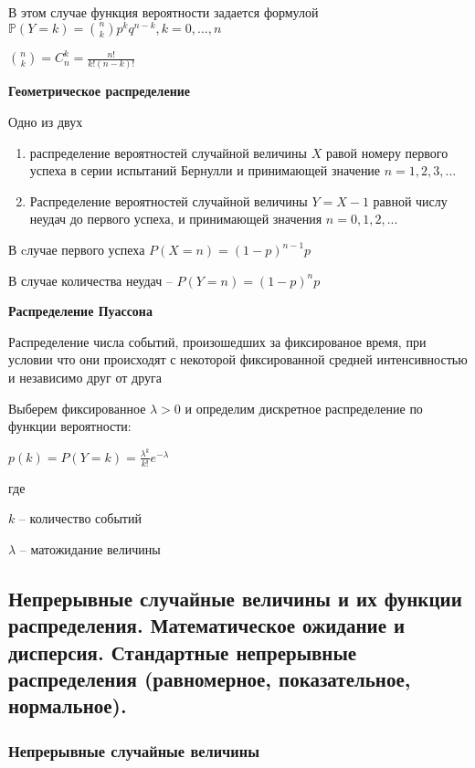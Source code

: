 \documentclass{article}
\begin{document}
В этом случае функция вероятности задается формулой $\mathbb{P}(Y = k) = {n \choose k} p^k q^{n - k}, k = 0, ..., n$

${n \choose k} = C_n^k = \frac{n!}{k!(n-k)!}$

{\bf Геометрическое распределение}

Одно из двух

\begin{enumerate}
	\item распределение вероятностей случайной величины $X$ равой номеру первого успеха в серии испытаний Бернулли и принимающей значение $n = 1, 2, 3,...$
	\item Распределение вероятностей случайной величины $Y = X - 1$ равной числу неудач до первого успеха, и принимающей значения $n = 0, 1, 2,...$
\end{enumerate}

В cлучае первого успеха $P(X = n) = (1 - p)^{n - 1}p$

В случае количества неудач -- $P(Y = n) = (1 - p)^n p$


{\bf Распределение Пуассона}

Распределение числа событий, произошедших за фиксированое время, при условии что они происходят с некоторой фиксированной средней интенсивностью и независимо друг от друга

Выберем фиксированное $\lambda > 0$ и определим дискретное распределение по функции вероятности:

$p(k) = P(Y = k) = \frac{\lambda^k}{k!}e^{-\lambda}$

где 

$k$ -- количество событий

$\lambda$ -- матожидание величины 



\subsection{Непрерывные случайные величины и их функции распределения. Математическое ожидание и дисперсия. Стандартные непрерывные распределения (равномерное, показательное, нормальное).}

\subsubsection{Непрерывные случайные величины}

\end{document}
